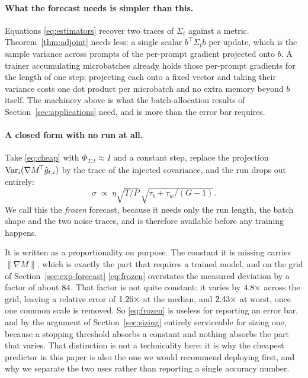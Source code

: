 \paragraph{What the forecast needs is simpler than this.} Equations \eqref{eq:estimators} recover
two traces of $\Sigma_t$ against a metric. Theorem~\ref{thm:adjoint} needs less: a single scalar
$b^{\!\top}\Sigma_t b$ per update, which is the sample variance across prompts of the per-prompt
gradient projected onto $b$. A trainer accumulating microbatches already holds those per-prompt
gradients for the length of one step; projecting each onto a fixed vector and taking their variance
costs one dot product per microbatch and no extra memory beyond $b$ itself. The machinery above is
what the batch-allocation results of Section~\ref{sec:applications} need, and is more than the
error bar requires.

\paragraph{A closed form with no run at all.} Take \eqref{eq:cheap} with
$\Phi_{T,t} \approx I$ and a constant step, replace the projection
$\operatorname{Var}_i(\nabla M^{\!\top}\hat g_{t,i})$ by the trace of the injected covariance, and the run drops
out entirely:
\begin{equation}
  \label{eq:frozen}
  \sigma \;\propto\; \eta \sqrt{T/P}\,\sqrt{\tau_b + \tau_w/(G-1)}.
\end{equation}
We call this the \emph{frozen} forecast, because it needs only the run length, the batch shape and
the two noise traces, and is therefore available before any training happens.

It is written as a proportionality on purpose. The constant it is missing carries $\|\nabla M\|$,
which is exactly the part that requires a trained model, and on the grid of
Section~\ref{sec:exp-forecast} \eqref{eq:frozen} overstates the measured deviation by a factor of
about $84$. That factor is not quite constant: it varies by
$4.8\times$ across the grid, leaving a relative error of
$1.26\times$ at the median, and $2.43\times$ at worst, once
one common scale is removed. So \eqref{eq:frozen} is useless for reporting an error bar, and by the
argument of Section~\ref{sec:sizing} entirely serviceable for sizing one, because a stopping
threshold absorbs a constant and nothing absorbs the part that varies. That distinction is not a
technicality here: it is why the cheapest predictor in this paper is also the one we would
recommend deploying first, and why we separate the two uses rather than reporting a single accuracy
number.

